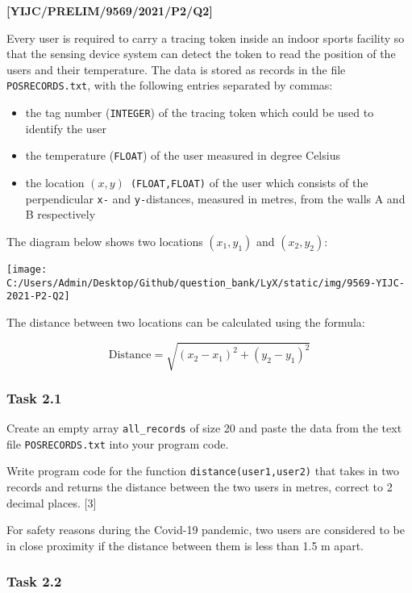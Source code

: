 \item \textbf{{[}YIJC/PRELIM/9569/2021/P2/Q2{]} }

Every user is required to carry a tracing token inside an indoor sports
facility so that the sensing device system can detect the token to
read the position of the users and their temperature. The data is
stored as records in the file \texttt{POSRECORDS.txt}, with the following
entries separated by commas: 
\begin{itemize}
\item the tag number (\texttt{INTEGER}) of the tracing token which could
be used to identify the user 
\item the temperature (\texttt{FLOAT}) of the user measured in degree Celsius 
\item the location $(x,y)$\texttt{ (FLOAT,FLOAT)} of the user which consists
of the perpendicular \texttt{x-} and \texttt{y-}distances, measured
in metres, from the walls A and B respectively 
\end{itemize}
The diagram below shows two locations $(x_{1},y_{1})$ and $(x_{2},y_{2})$: 
\noindent \begin{center}
\texttt{[image: C:/Users/Admin/Desktop/Github/question\_bank/LyX/static/img/9569-YIJC-2021-P2-Q2]}
\par\end{center}

The distance between two locations can be calculated using the formula: 

\[
\text{Distance}=\sqrt{(x_{2}-x_{1})^{2}+(y_{2}-y_{1})^{2}}
\]


\subsubsection*{Task 2.1 }

Create an empty array \texttt{all\_records} of size 20 and paste the
data from the text file \texttt{POSRECORDS.txt} into your program
code. 

Write program code for the function \texttt{distance(user1,user2)}
that takes in two records and returns the distance between the two
users in metres, correct to 2 decimal places. \hfill{} {[}3{]}

For safety reasons during the Covid-19 pandemic, two users are considered
to be in close proximity if the distance between them is less than
1.5 m apart. 

\subsubsection*{Task 2.2 }

